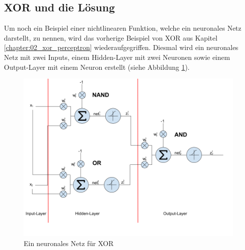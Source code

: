\subsection{XOR und die Lösung}
Um noch ein Beispiel einer nichtlinearen Funktion, welche ein neuronales Netz darstellt, zu nennen, wird das vorherige
Beispiel von \glqq XOR\grqq{} aus Kapitel \ref{chapter:02_xor_perceptron} wiederaufgegriffen. Diesmal wird ein neuronales Netz mit
zwei Inputs, einem Hidden-Layer mit zwei Neuronen sowie einem Output-Layer mit einem Neuron erstellt (siehe Abbildung
\ref{fig:10_xor_neuronal_network}).
\begin{figure}[h!]
    \begin{center}
        \includegraphics[width=1\linewidth]{../common/01_neuronal_network/00_resources/06_xor_neuronal_network.png}
    \end{center}
    \caption{Ein neuronales Netz für XOR}
    \label{fig:10_xor_neuronal_network}
\end{figure}
\newpage

